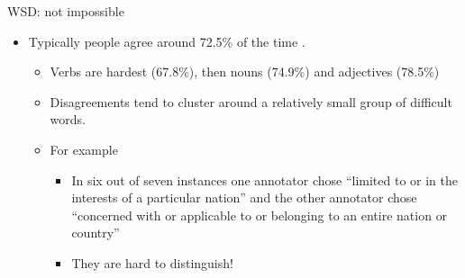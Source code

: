 \begin{frame}{WSD:  not impossible}
  \begin{itemize}
  \item Typically people agree around 72.5\% of the time \citep{Snyder:Palmer:2004}.
    \begin{itemize}
    \item  Verbs are hardest (67.8\%), then nouns (74.9\%) and adjectives (78.5\%)
    \item Disagreements tend to cluster around a relatively small group of difficult words.
    \item For example 
      \begin{itemize}
      \item In six out of seven instances one annotator chose
        ``limited to or in the interests of a particular nation'' and
        the other annotator chose ``concerned with or applicable to or
        belonging to an entire nation or country''
      \item They are hard to distinguish!
      \end{itemize}
    \end{itemize}
  \end{itemize}
\end{frame}
